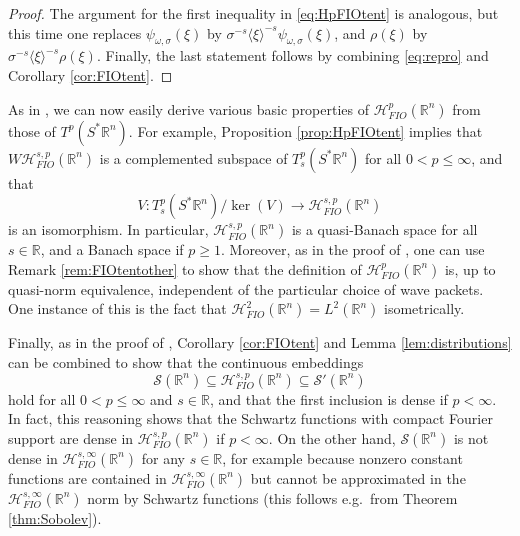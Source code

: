 \documentclass{amsart}
\newcommand {\HT}{\mathcal{H}}
\newcommand {\Hp}{\mathcal{H}^{p}_{FIO}(\Rn)}
\newcommand {\Hps}{\mathcal{H}^{s,p}_{FIO}(\Rn)}
\newcommand {\rb}{\rangle}
\newcommand {\lb}{\langle}
\newcommand {\La}{\mathcal{L}}
\newcommand {\R}{\mathbb R}
\newcommand {\Rn}{\mathbb{R}^{n}}
\newcommand {\Sp}{S^{*}\Rn}
\newcommand {\Sw}{\mathcal{S}}
\newcommand {\w}{\omega}
\newcommand {\wt}{\widetilde}
\theoremstyle{definition}
\numberwithin{equation}{section}
\begin{document}
\begin{proof}
The argument for the first inequality in \eqref{eq:HpFIOtent} is analogous, but %
this time one replaces $\psi_{\w,\sigma}(\xi)$ %
by $\sigma^{-s}\lb \xi\rb^{-s}\psi_{\w,\sigma}(\xi)$, and %
$\rho(\xi)$ %
by $\sigma^{-s}\lb \xi\rb^{-s}\rho(\xi)$. %
Finally, the last statement follows by combining \eqref{eq:repro} and Corollary \ref{cor:FIOtent}.
\end{proof}

As in \cite{HaPoRo20}, we can now easily %
 derive various basic properties of $\Hp$ from those of $T^{p}(\Sp)$. For example, Proposition \ref{prop:HpFIOtent} %
implies that %
$W\Hps$ is a complemented subspace of $T^{p}_{s}(\Sp)$ for all $0<p\leq \infty$, and that
\[
V:T^{p}_{s}(\Sp)/\ker(V)\to \Hps
\]
is an isomorphism. In particular, $\Hps$ is a quasi-Banach space for all $s\in\R$, and a Banach space if $p\geq 1$. Moreover, as in the proof of \cite[Proposition 6.4]{HaPoRo20}, one can use Remark \ref{rem:FIOtentother} %
to show that the definition of $\Hp$ is, up to quasi-norm equivalence, independent of the particular choice of wave packets. One instance of this is the fact that $\HT^{2}_{FIO}(\Rn)=L^{2}(\Rn)$ isometrically.

Finally, as in the proof of \cite[Proposition 6.6]{HaPoRo20}, Corollary \ref{cor:FIOtent} and Lemma \ref{lem:distributions} can be combined to show that the continuous embeddings
\[
\Sw(\Rn)\subseteq \Hps\subseteq\Sw'(\Rn)
\]
hold for all $0<p\leq \infty$ and $s\in\R$, and that the first inclusion is dense if $p<\infty$. In fact, this reasoning shows that the Schwartz functions with compact Fourier support are dense in $\Hps$ if $p<\infty$. On the other hand, %
$\Sw(\Rn)$ is not dense in $\HT^{s,\infty}_{FIO}(\Rn)$ for any $s\in\R$, for example because nonzero constant functions are contained in $\HT^{s,\infty}_{FIO}(\Rn)$ but %
cannot be approximated in the $\HT^{s,\infty}_{FIO}(\Rn)$ norm by Schwartz functions (this follows e.g.~from  Theorem \ref{thm:Sobolev}). 
\end{document}
